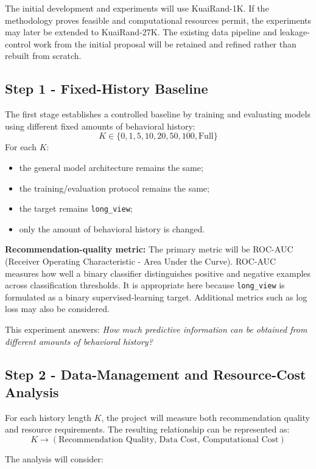 \documentclass[12pt,a4paper]{article}
\begin{document}
The initial development and experiments will use KuaiRand-1K. If the methodology proves feasible and computational resources permit, the experiments may later be extended to KuaiRand-27K. The existing data pipeline and leakage-control work from the initial proposal will be retained and refined rather than rebuilt from scratch.

\subsection{Step 1 - Fixed-History Baseline}
The first stage establishes a controlled baseline by training and evaluating models using different fixed amounts of behavioral history:
\[ K \in \{0, 1, 5, 10, 20, 50, 100, \text{Full}\} \]
For each $K$:
\begin{itemize}
    \item the general model architecture remains the same;
    \item the training/evaluation protocol remains the same;
    \item the target remains \texttt{long\_view};
    \item only the amount of behavioral history is changed.
\end{itemize}

\textbf{Recommendation-quality metric:} The primary metric will be ROC-AUC (Receiver Operating Characteristic - Area Under the Curve). ROC-AUC measures how well a binary classifier distinguishes positive and negative examples across classification thresholds. It is appropriate here because \texttt{long\_view} is formulated as a binary supervised-learning target. Additional metrics such as log loss may also be considered.

This experiment answers: \textit{How much predictive information can be obtained from different amounts of behavioral history?}

\subsection{Step 2 - Data-Management and Resource-Cost Analysis}
For each history length $K$, the project will measure both recommendation quality and resource requirements. The resulting relationship can be represented as:
\[ K \rightarrow (\text{Recommendation Quality, Data Cost, Computational Cost}) \]

The analysis will consider:
\end{document}

